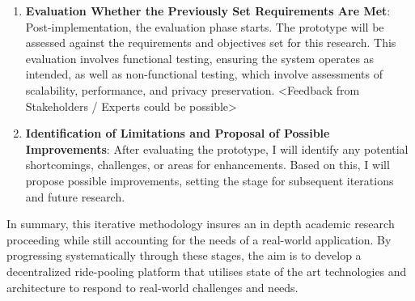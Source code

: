 \begin{enumerate}
    \item \textbf{Evaluation Whether the Previously Set Requirements Are Met}: 
    Post-implementation, the evaluation phase starts. The prototype will be assessed against the requirements and objectives set for this research. This evaluation involves functional testing, ensuring the system operates as intended, as well as non-functional testing, which involve assessments of scalability, performance, and privacy preservation. <Feedback from Stakeholders / Experts could be possible>

    \item \textbf{Identification of Limitations and Proposal of Possible Improvements}:
After evaluating the prototype, I will identify any potential shortcomings, challenges, or areas for enhancements. Based on this, I will propose possible improvements, setting the stage for subsequent iterations and future research.
\end{enumerate}

In summary, this iterative methodology insures an in depth academic research proceeding while still accounting for the needs of a real-world application. By progressing systematically through these stages, the aim is to develop a decentralized ride-pooling platform that utilises state of the art technologies and architecture to respond to real-world challenges and needs.
